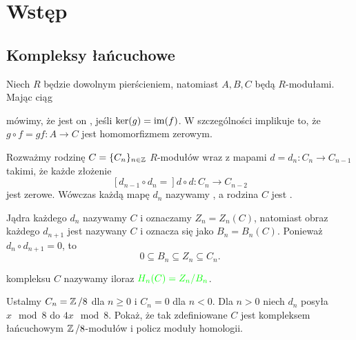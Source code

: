 \section{Wstęp}

\subsection{Kompleksy łańcuchowe}

Niech $R$ będzie dowolnym pierścieniem, natomiast $A, B, C$ będą $R$-modułami. Mając ciąg

\begin{center}\end{center}

mówimy, że jest on , jeśli $\ker(g)=\operatorname{im}(f)$. W szczególności implikuje to, że $g\circ f=gf:A\to C$ jest homomorfizmem zerowym.

\begin{definition}
  Rozważmy rodzinę $C=\{C_n\}_{n\in\operatorname{\mathbb{Z}}}$ $R$-modułów wraz z mapami $d=d_n:C_n\to C_{n-1}$ takimi, że każde złożenie
  $$[d_{n-1}\circ d_n=]d\circ d:C_n\to C_{n-2}$$
  jest zerowe. Wówczas każdą mapę $d_n$ nazywamy , a rodzina $C$ jest .
\end{definition}

Jądra każdego $d_n$ nazywamy  $C$ i oznaczamy $Z_n=Z_n(C)$, natomiast obraz każdego $d_{n+1}$ jest nazywany  $C$ i oznacza się jako $B_n=B_n(C)$. Ponieważ $d_n\circ d_{n+1}=0$, to
$$0\subseteq B_n\subseteq Z_n\subseteq C_n.$$

\begin{definition}[Homologia]
   kompleksu $C$ nazywamy iloraz $\color{green}H_n(C)=Z_n/B_n$.
\end{definition}

\begin{problem}
  Ustalmy $C_n=\operatorname{\mathbb{Z}}/8$ dla $n\geq0$ i $C_n=0$ dla $n<0$. Dla $n>0$ niech $d_n$ posyła $x\mod 8$ do $4x\mod 8$. Pokaż, że tak zdefiniowane $C$ jest kompleksem łańcuchowym $\operatorname{\mathbb{Z}}/8$-modułów i policz moduły homologii.
\end{problem}

